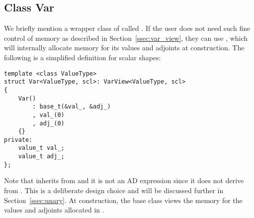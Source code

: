 \subsection{Class Var}\label{ssec:var}

We briefly mention a wrapper class of  called .
If the user does not need such fine control of memory as described in Section~\ref{ssec:var_view},
they can use , which will internally allocate memory for its values and adjoints at construction.
The following is a simplified definition for scalar shapes:
\begin{lstlisting}[style=customcpp]
template <class ValueType>
struct Var<ValueType, scl>: VarView<ValueType, scl>
{
    Var()
        : base_t(&val_, &adj_) 
        , val_(0)
        , adj_(0)
    {}
private:
    value_t val_;
    value_t adj_;
};
\end{lstlisting}
Note that  inherits from  and 
it is not an AD expression since it does not derive from .
This is a deliberate design choice and will be discussed further in Section~\ref{ssec:unary}.
At construction, the base class  
views the memory for the values and adjoints allocated in .
